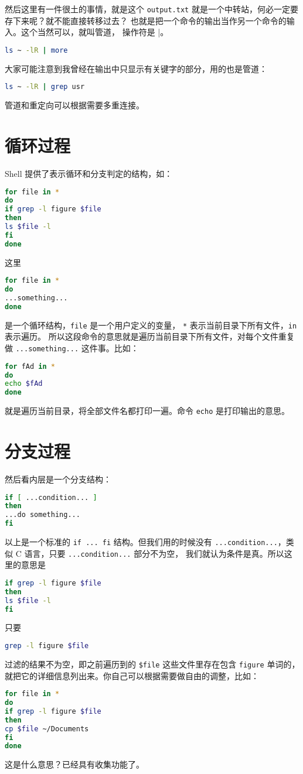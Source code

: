 \documentclass[a4paper]{ctexart}
\begin{document}
然后这里有一件很土的事情，就是这个
\verb|output.txt| 就是一个中转站，何必一定要存下来呢？就不能直接转移过去？
也就是把一个命令的输出当作另一个命令的输入。这个当然可以，就叫管道，
操作符是 \verb|||。
\begin{lstlisting}[language=sh]
ls ~ -lR | more
\end{lstlisting}
大家可能注意到我曾经在输出中只显示有关键字的部分，用的也是管道：
\begin{lstlisting}[language=sh]
ls ~ -lR | grep usr
\end{lstlisting}
管道和重定向可以根据需要多重连接。

\section{循环过程}

Shell 提供了表示循环和分支判定的结构，如：
\begin{lstlisting}[language=sh]
for file in *
do
if grep -l figure $file
then
ls $file -l
fi
done
\end{lstlisting}
这里
\begin{lstlisting}[language=sh]
for file in *
do
...something...
done
\end{lstlisting}
是一个循环结构，\verb|file| 是一个用户定义的变量，
\verb|*| 表示当前目录下所有文件，\verb|in| 表示遍历。
所以这段命令的意思就是遍历当前目录下所有文件，对每个文件重复做
\verb|...something...| 这件事。比如：
\begin{lstlisting}[language=sh]
for fAd in *
do
echo $fAd
done
\end{lstlisting}
就是遍历当前目录，将全部文件名都打印一遍。命令 \verb|echo| 是打印输出的意思。

\section{分支过程}
然后看内层是一个分支结构：
\begin{lstlisting}[language=sh]
if [ ...condition... ]
then
...do something...
fi
\end{lstlisting}
以上是一个标准的 \verb|if ... fi| 结构。但我们用的时候没有
\verb|...condition...|，类似 C 语言，只要 \verb|...condition...| 部分不为空，
我们就认为条件是真。所以这里的意思是
\begin{lstlisting}[language=sh]
if grep -l figure $file
then
ls $file -l
fi
\end{lstlisting}
只要
\begin{lstlisting}[language=sh]
grep -l figure $file
\end{lstlisting}
过滤的结果不为空，即之前遍历到的 \verb|$file| 这些文件里存在包含 \verb|figure|
单词的，就把它的详细信息列出来。你自己可以根据需要做自由的调整，比如：
\begin{lstlisting}[language=sh]
for file in *
do
if grep -l figure $file
then
cp $file ~/Documents
fi
done
\end{lstlisting}
这是什么意思？已经具有收集功能了。
\end{document}
